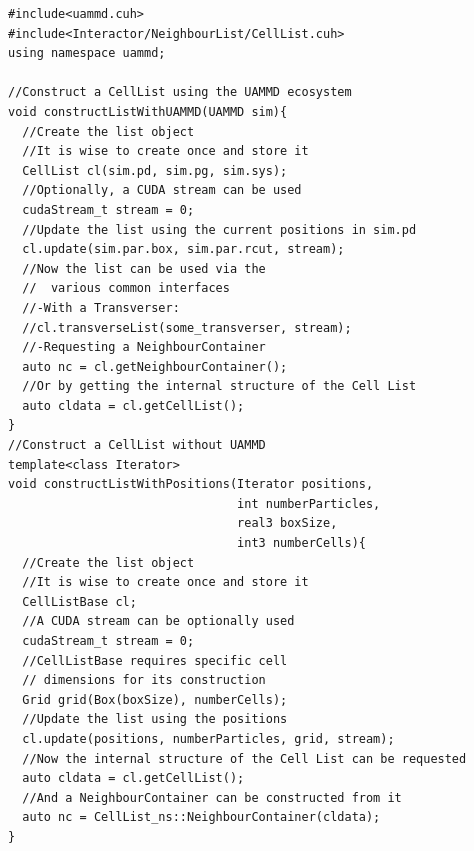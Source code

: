 \documentclass[ twoside,openright,titlepage,numbers=noenddot,%
headinclude,footinclude,cleardoublepage=empty,abstract=on,
BCOR=5mm,paper=a4,fontsize=11pt, dvipsnames
]{scrreprt}
\begin{document}
\begin{verbatim}
#include<uammd.cuh>
#include<Interactor/NeighbourList/CellList.cuh>
using namespace uammd;

//Construct a CellList using the UAMMD ecosystem
void constructListWithUAMMD(UAMMD sim){
  //Create the list object
  //It is wise to create once and store it
  CellList cl(sim.pd, sim.pg, sim.sys);
  //Optionally, a CUDA stream can be used
  cudaStream_t stream = 0;
  //Update the list using the current positions in sim.pd
  cl.update(sim.par.box, sim.par.rcut, stream);
  //Now the list can be used via the
  //  various common interfaces
  //-With a Transverser:
  //cl.transverseList(some_transverser, stream);
  //-Requesting a NeighbourContainer
  auto nc = cl.getNeighbourContainer();
  //Or by getting the internal structure of the Cell List
  auto cldata = cl.getCellList();
}
//Construct a CellList without UAMMD
template<class Iterator>
void constructListWithPositions(Iterator positions, 
                                int numberParticles,
                                real3 boxSize, 
                                int3 numberCells){
  //Create the list object
  //It is wise to create once and store it
  CellListBase cl;
  //A CUDA stream can be optionally used
  cudaStream_t stream = 0;
  //CellListBase requires specific cell 
  // dimensions for its construction
  Grid grid(Box(boxSize), numberCells);
  //Update the list using the positions
  cl.update(positions, numberParticles, grid, stream);
  //Now the internal structure of the Cell List can be requested
  auto cldata = cl.getCellList();
  //And a NeighbourContainer can be constructed from it
  auto nc = CellList_ns::NeighbourContainer(cldata);
}
\end{verbatim}
\end{document}
